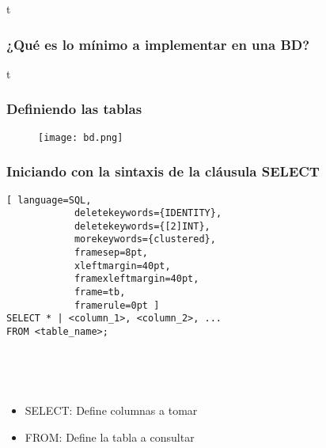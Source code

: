 
\begin{frame}{t}
	
	\frametitle{¿Qué es lo mínimo a implementar en una BD?}
	
	

\end{frame}


\begin{frame}{t}
	
	\frametitle{Definiendo las tablas}
	
	\begin{figure}[h]
	\centering
		\texttt{[image: bd.png]}
	\end{figure}

	
\end{frame}


\begin{frame}[fragile]
	
	\frametitle{Iniciando con la sintaxis de la cláusula SELECT}
	
		\begin{lstlisting}[ language=SQL,
			deletekeywords={IDENTITY},
			deletekeywords={[2]INT},
			morekeywords={clustered},
			framesep=8pt,
			xleftmargin=40pt,
			framexleftmargin=40pt,
			frame=tb,
			framerule=0pt ]
SELECT * | <column_1>, <column_2>, ...
FROM <table_name>;
\end{lstlisting}

	\pause
	
	\ 
	
	\ 
	
	\begin{itemize}
		\item SELECT: Define columnas a tomar
		\item FROM: Define la tabla a consultar
	\end{itemize}

\end{frame}

